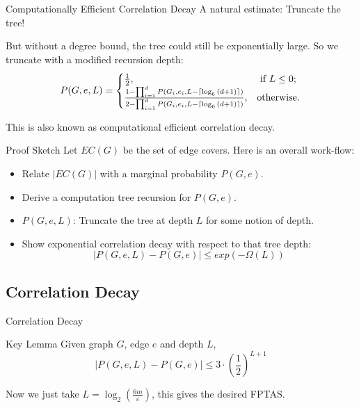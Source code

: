 \documentclass[mathserif]{beamer}
\newcommand{\abs}[1]{\left\vert#1\right\vert}
\newcommand{\eps}{\varepsilon}
\begin{document}
\begin{frame}{Computationally Efficient Correlation Decay}
	A natural estimate: Truncate the tree!

	\bigskip

	But without a degree bound, the tree could still be exponentially large.
	So we truncate with a modified recursion depth:
	\[
		P(G, e, L) =
		\begin{cases}
			\frac{1}{2}, & \hbox{ if $L \leq 0$;} \\
			\frac{1-\prod_{i=1}^d P(G_i, e_i, L - \lceil \log_6{(d+1)} \rceil)}{2 - \prod_{i=1}^d P(G_i, e_i, L - \lceil \log_6{(d+1)} \rceil)}, &\hbox{otherwise.}
		\end{cases}
	\]

	\bigskip
	This is also known as computational efficient correlation decay.

\end{frame}

\begin{frame}{Proof Sketch}
Let $EC(G)$ be the set of edge covers.
Here is an overall work-flow:
\begin{itemize}
  \item{Relate $\abs{EC(G)}$ with a marginal probability $P(G,e)$.}
  \item{Derive a computation tree recursion for $P(G,e)$.}
  \item{$P(G,e,L)$: Truncate the tree at depth $L$ for some notion of depth.}
  \item\alert{ Show exponential correlation decay with respect to that tree depth:
  \[
    \abs{ P(G,e,L) - P(G,e) } \leq exp(-\Omega(L))
  \]}
\end{itemize}
\end{frame}

\subsection{Correlation Decay}
\begin{frame}{Correlation Decay}

	\begin{block}{Key Lemma}
	Given graph $G$, edge $e$ and depth $L$,
	\[\abs{P(G,e,L) - P(G,e)} \leq 3\cdot(\frac{1}{2})^{L+1}\]
\end{block}
    Now we just take $L = \log_2 \left(\frac{6m}{\eps} \right)$, this gives the desired FPTAS.
\end{frame}
\end{document}
